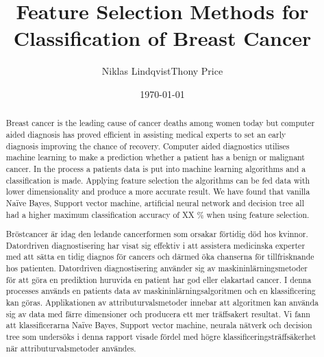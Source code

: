 \documentclass{kththesis}
\title{Feature Selection Methods for Classification of Breast Cancer}
\author{Niklas Lindqvist\newline Thony Price}
\date{\today}
\begin{document}
\frontmatter
\titlepage



\begin{abstract}

  Breast cancer is the leading cause of cancer deaths among women today but computer aided diagnosis has proved efficient in assisting medical experts to set an early diagnosis improving the chance of recovery. Computer aided diagnostics utilises machine learning to make a prediction whether a patient has a benign or malignant cancer. In the process a patients data is put into machine learning algorithms and a classification is made. Applying feature selection the algorithms can be fed data with lower dimensionality and produce a more accurate result. We have found that vanilla Naïve Bayes, Support vector machine, artificial neural network and decision tree all had a higher maximum classification accuracy of XX \% when using feature selection.
\end{abstract}



\begin{otherlanguage}{swedish}
  \begin{abstract}

  Bröstcancer är idag den ledande cancerformen som orsakar förtidig död hos kvinnor. Datordriven diagnostisering har visat sig effektiv i att assistera medicinska experter med att sätta en tidig diagnos för cancers och därmed öka chanserna för tillfrisknande hos patienten. Datordriven diagnostisering använder sig av maskininlärningsmetoder för att göra en prediktion huruvida en patient har god eller elakartad cancer. I denna processes används en patients data av maskininlärningsalgoritmen och en klassificering kan göras. Applikationen av attributurvalsmetoder innebar att algoritmen kan använda sig av data med färre dimensioner och producera ett mer träffsakert resultat. Vi fann att klassificerarna Naïve Bayes, Support vector machine, neurala nätverk och decision tree som undersöks i denna rapport visade fördel med högre klassificeringsträffsäkerhet när attributurvalsmetoder användes.



  \end{abstract}

\end{otherlanguage}


\tableofcontents
\mainmatter
\end{document}
